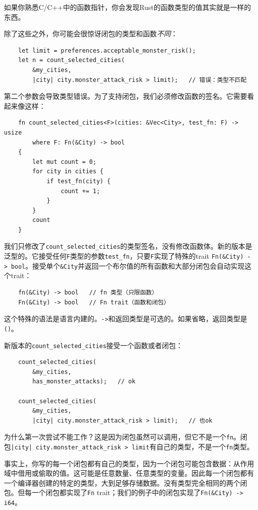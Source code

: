 如果你熟悉C/C++中的函数指针，你会发现Rust的函数类型的值其实就是一样的东西。

除了这些之外，你可能会很惊讶闭包的类型和函数\emph{不同}：
\begin{verbatim}
    let limit = preferences.acceptable_monster_risk();
    let n = count_selected_cities(
        &my_cities,
        |city| city.monster_attack_risk > limit);   // 错误：类型不匹配
\end{verbatim}

第二个参数会导致类型错误。为了支持闭包，我们必须修改函数的签名。它需要看起来像这样：
\begin{verbatim}
    fn count_selected_cities<F>(cities: &Vec<City>, test_fn: F) -> usize
        where F: Fn(&City) -> bool
    {
        let mut count = 0;
        for city in cities {
            if test_fn(city) {
                count += 1;
            }
        }
        count
    }
\end{verbatim}

我们只修改了\texttt{count\_selected\_cities}的类型签名，没有修改函数体。新的版本是泛型的。它接受任何\texttt{F}类型的参数\texttt{test\_fn}，只要\texttt{F}实现了特殊的trait \texttt{Fn(\&City) -> bool}。接受单个\texttt{\&City}并返回一个布尔值的所有函数和大部分闭包会自动实现这个trait：
\begin{verbatim}
    fn(&City) -> bool   // fn 类型（只限函数）
    Fn(&City) -> bool   // Fn trait（函数和闭包）
\end{verbatim}

这个特殊的语法是语言内建的。\texttt{->}和返回类型是可选的。如果省略，返回类型是\texttt{()}。

新版本的\texttt{count\_selected\_cities}接受一个函数或者闭包：
\begin{verbatim}
    count_selected_cities(
        &my_cities,
        has_monster_attacks);   // ok

    count_selected_cities(
        &my_cities,
        |city| city.monster_attack_risk > limit);   // 也ok
\end{verbatim}

为什么第一次尝试不能工作？这是因为闭包虽然可以调用，但它不是一个\texttt{fn}。闭包\texttt{|city| city.monster\_attack\_risk > limit}有自己的类型，不是一个\texttt{fn}类型。

事实上，你写的每一个闭包都有自己的类型，因为一个闭包可能包含数据：从作用域中借用或偷取的值。这可能是任意数量、任意类型的变量。因此每一个闭包都有一个编译器创建的特定的类型，大到足够存储数据。没有类型完全相同的两个闭包。但每一个闭包都实现了\texttt{Fn} trait；我们的例子中的闭包实现了\texttt{Fn(\&City) -> i64}。

